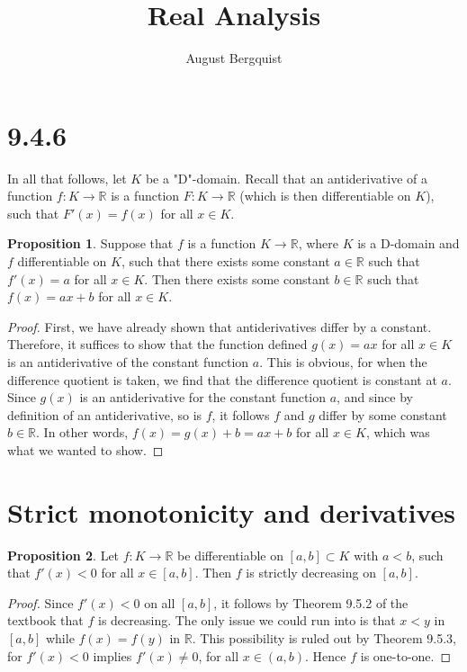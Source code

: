 \documentclass[11pt]{article}
\title{Real Analysis}
\author{August Bergquist}
\newcommand{\R}{\mathbb{R}}
\theoremstyle{definition}
\newtheorem{proposition}{Proposition}
\begin{document}
\maketitle

\section{9.4.6}

In all that follows, let $K$ be a "D"-domain. Recall that an antiderivative of a function $f:K\to \R$ is a function $F:K\to \R$ (which is then differentiable on $K$), such that $F'(x) = f(x)$ for all $x\in K$.

\begin{proposition}
Suppose that $f$ is a function $K\to \R$, where $K$ is a D-domain and $f$ differentiable on $K$, such that there exists some constant $a\in \R$ such that $f'(x) = a$ for all $x\in K$. Then there exists some constant $b\in \R$ such that $f(x) = ax + b$ for all $x\in K$.

\end{proposition}

\begin{proof}
First, we have already shown that antiderivatives differ by a constant. Therefore, it suffices to show that the function defined $g(x) = ax $ for all $x\in K$ is an antiderivative of the constant function $a$. This is obvious, for when the difference quotient is taken, we find that the difference quotient is constant at $a$. \\

Since $g(x)$ is an antiderivative for the constant function $a$, and since by definition of an antiderivative, so is $f$, it follows $f$ and $g$ differ by some constant $b\in \R$. In other words, $f(x) = g(x) + b = ax + b$ for all $x\in K$, which was what we wanted to show.
\end{proof}

\section{Strict monotonicity and derivatives}

\begin{proposition}
Let $f:K\to \R$ be differentiable on $[a,b]\subset K$ with $a < b$, such that $f'(x) < 0$ for all $ x\in [a,b]$. Then $f$ is strictly decreasing on $[a,b]$. 
\end{proposition}

\begin{proof}
Since $f'(x) < 0$ on all $[a,b]$, it follows by Theorem 9.5.2 of the textbook that $f$ is decreasing. The only issue we could run into is that $x < y$ in $[a,b]$ while $f(x) = f(y)$ in $\R$. This possibility is ruled out by Theorem 9.5.3, for $f'(x) < 0$ implies $f'(x)\ne 0$, for all $x\in (a,b)$. Hence $f$ is one-to-one.
\end{proof}
\end{document}
